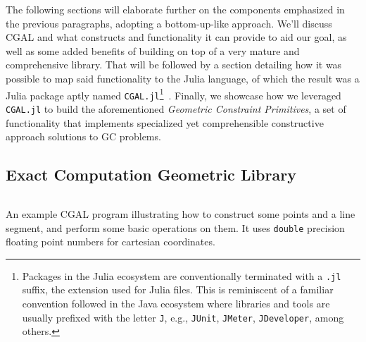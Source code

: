 The following sections will elaborate further on the components emphasized in
the previous paragraphs, adopting a bottom-up-like approach.  We'll discuss
\ac{CGAL} and what constructs and functionality it can provide to aid our goal,
as well as some added benefits of building on top of a very mature and
comprehensive library.  That will be followed by a section detailing how it was
possible to map said functionality to the Julia language, of which the result
was a Julia package aptly named \texttt{CGAL.jl}\footnote{Packages in the Julia
ecosystem are conventionally terminated with a \texttt{.jl} suffix, the
extension used for Julia files.  This is reminiscent of a familiar convention
followed in the Java ecosystem where libraries and tools are usually prefixed
with the letter \texttt{J}, e.g., \texttt{JUnit}, \texttt{JMeter},
\texttt{JDeveloper}, among others.}~\cite{Ventura:2019:CGAL.jl}.  Finally, we
showcase how we leveraged \texttt{CGAL.jl} to build the aforementioned
\textit{Geometric Constraint Primitives}, a set of functionality that implements
specialized yet comprehensible constructive approach solutions to \ac{GC}
problems.

\subsection{Exact Computation Geometric Library}%
\label{sec:solution.impl.cgal}

\begin{listing}[htb]
  \inputminted{cpp}{cpp/points_and_segments.cpp}
  \caption[CGAL: Three points and one segment]{
    An example CGAL program illustrating how to construct some points and a line
    segment, and perform some basic operations on them.  It uses \texttt{double}
    precision floating point numbers for cartesian coordinates.
  }
  \label{lst:solution.impl.cgal.pas}
\end{listing}

